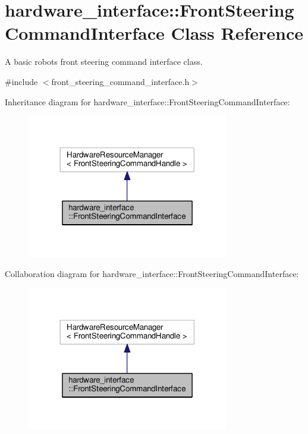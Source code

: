 \hypertarget{classhardware__interface_1_1FrontSteeringCommandInterface}{}\section{hardware\+\_\+interface\+:\+:Front\+Steering\+Command\+Interface Class Reference}
\label{classhardware__interface_1_1FrontSteeringCommandInterface}


A basic robot\textquotesingle{}s front steering command interface class.  




{\ttfamily \#include $<$front\+\_\+steering\+\_\+command\+\_\+interface.\+h$>$}



Inheritance diagram for hardware\+\_\+interface\+:\+:Front\+Steering\+Command\+Interface\+:\nopagebreak
\begin{figure}[H]
\begin{center}
\leavevmode
\includegraphics[width=249pt]{classhardware__interface_1_1FrontSteeringCommandInterface__inherit__graph}
\end{center}
\end{figure}


Collaboration diagram for hardware\+\_\+interface\+:\+:Front\+Steering\+Command\+Interface\+:\nopagebreak
\begin{figure}[H]
\begin{center}
\leavevmode
\includegraphics[width=249pt]{classhardware__interface_1_1FrontSteeringCommandInterface__coll__graph}
\end{center}
\end{figure}


